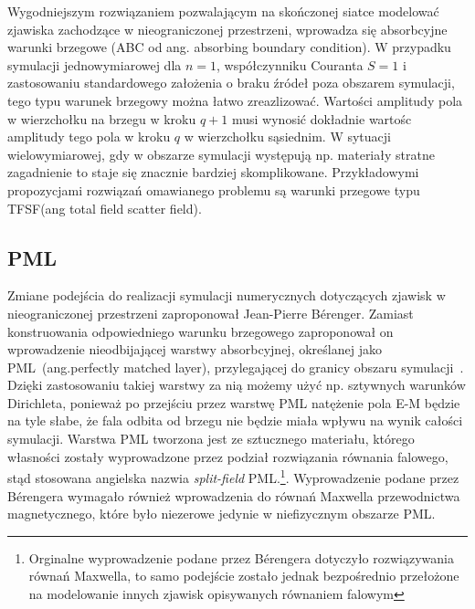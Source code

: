 Wygodniejszym rozwiązaniem pozwalającym na skończonej siatce modelować zjawiska zachodzące w nieograniczonej przestrzeni, wprowadza się absorbcyjne warunki brzegowe (ABC od ang. absorbing boundary condition). W przypadku symulacji jednowymiarowej dla $n=1$, współczynniku Couranta $S=1$ i zastosowaniu standardowego założenia o braku źródeł poza obszarem symulacji, tego typu warunek brzegowy można łatwo zreazlizować. Wartości amplitudy pola w wierzchołku na brzegu w kroku $q+1$ musi wynosić dokładnie wartośc amplitudy tego pola w kroku $q$ w wierzchołku sąsiednim. W sytuacji wielowymiarowej, gdy w obszarze symulacji występują np. materiały stratne zagadnienie to staje się znacznie bardziej skomplikowane. Przykładowymi propozycjami rozwiązań omawianego problemu są warunki przegowe typu TFSF(ang total field scatter field).

\subsection{PML}
\label{art:pml}
Zmiane podejścia do realizacji symulacji numerycznych dotyczących zjawisk w nieograniczonej przestrzeni zaproponował Jean-Pierre B\'{e}renger. Zamiast konstruowania odpowiedniego warunku brzegowego zaproponował on wprowadzenie nieodbijającej warstwy absorbcyjnej, określanej jako PML~(ang.perfectly matched layer), przylegającej do granicy obszaru symulacji~\cite{1994JCoPh.114..185B}. Dzięki zastosowaniu takiej warstwy za nią możemy użyć np. sztywnych warunków Dirichleta, ponieważ po przejściu przez warstwę PML natężenie pola E-M będzie na tyle słabe, że fala odbita od brzegu nie będzie miała wpływu na wynik całości symulacji. Warstwa PML tworzona jest ze sztucznego materiału, którego własności zostały wyprowadzone przez podział rozwiązania równania falowego,  stąd stosowana angielska nazwia {\it split-field} PML.\footnote{Orginalne wyprowadzenie podane przez B\'{e}rengera dotyczyło rozwiązywania równań Maxwella, to samo podejście zostało jednak bezpośrednio przełożone na modelowanie innych zjawisk opisywanych równaniem falowym}.  Wyprowadzenie podane przez B\'{e}rengera  wymagało również wprowadzenia do równań Maxwella przewodnictwa magnetycznego, które było niezerowe jedynie w niefizycznym obszarze PML.


